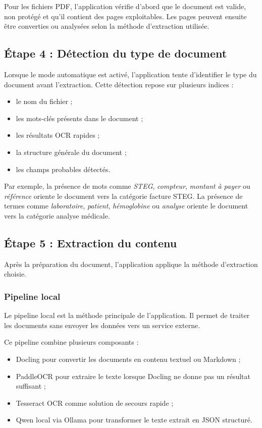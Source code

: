 Pour les fichiers PDF, l'application vérifie d'abord que le document est valide, non protégé et qu'il contient des pages exploitables. Les pages peuvent ensuite être converties ou analysées selon la méthode d'extraction utilisée.

\subsection{Étape 4 : Détection du type de document}

Lorsque le mode automatique est activé, l'application tente d'identifier le type du document avant l'extraction. Cette détection repose sur plusieurs indices :

\begin{itemize}
\item le nom du fichier ;
\item les mots-clés présents dans le document ;
\item les résultats OCR rapides ;
\item la structure générale du document ;
\item les champs probables détectés.
\end{itemize}

Par exemple, la présence de mots comme \textit{STEG}, \textit{compteur}, \textit{montant à payer} ou \textit{référence} oriente le document vers la catégorie facture STEG. La présence de termes comme \textit{laboratoire}, \textit{patient}, \textit{hémoglobine} ou \textit{analyse} oriente le document vers la catégorie analyse médicale.

\subsection{Étape 5 : Extraction du contenu}

Après la préparation du document, l'application applique la méthode d'extraction choisie.

\subsubsection{Pipeline local}

Le pipeline local est la méthode principale de l'application. Il permet de traiter les documents sans envoyer les données vers un service externe.

Ce pipeline combine plusieurs composants :

\begin{itemize}
\item Docling pour convertir les documents en contenu textuel ou Markdown ;
\item PaddleOCR pour extraire le texte lorsque Docling ne donne pas un résultat suffisant ;
\item Tesseract OCR comme solution de secours rapide ;
\item Qwen local via Ollama pour transformer le texte extrait en JSON structuré.
\end{itemize}

